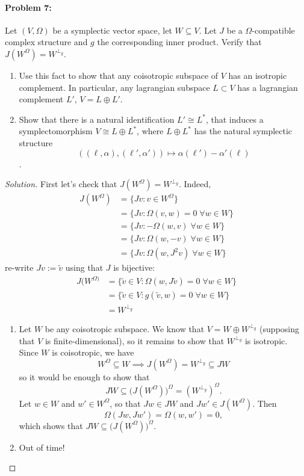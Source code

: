 \paragraph{Problem 7:} Let $(V,\Omega)$ be a symplectic vector space, let $W\subseteq V$. Let $J$ be a $\Omega$-compatible complex structure and $g$ the corresponding inner product. Verify that $J(W^{\Omega} )=W^{\perp_{g}}$.
\begin{enumerate}[label=\alph*.]
	\item Use this fact to show that any coisotropic subspace of $V$ has an isotropic complement. In particular, any lagrangian subspace $L\subset V$ has a lagrangian complement $L'$, $V=L\oplus L'$.
	
\item Show that there is a natural identification $L'\cong L^{*}$, that induces a symplectomorphism $V\cong L\oplus L^{*}$, where $L\oplus L^{*}$ has the natural symplectic structure \[\left( (\ell,\alpha),(\ell',\alpha') \right)\longmapsto\alpha(\ell')-\alpha'(\ell)\].
\end{enumerate}

\begin{proof}[Solution]\leavevmode
	First let's check that $J(W^{\Omega} )=W^{\perp_{g}}$. Indeed,
	\begin{align*}
		J(W^{\Omega} )&= \{Jv:v\in W^{\Omega}\}\\
&=\{Jv:\Omega(v,w)=0\;\forall w\in W\} \\
&=\{Jv:-\Omega(w,v)\;\forall w\in W\} \\
&=\{Jv:\Omega(w,-v)\;\forall w\in W\} \\
&=\{Jv:\Omega(w,J^{2}v)\;\forall w\in W\}
	\end{align*}
re-write $Jv:=\tilde{v}$ using that $J$ is bijective:
	\begin{align*}
J(W^{\Omega)}&=\{\tilde{v}\in V:\Omega(w,J\tilde{v})=0\;\forall w\in W\} \\
&=\{ \tilde{v}\in V:g(\tilde{v},w)=0\;\forall w\in W\} \\
& =W^{\perp_{g}}
	\end{align*}
	\begin{enumerate}[label=\alph*.]
		\item Let $W$ be any coisotropic subspace. We know that $V=W\oplus W^{\perp_g}$ (supposing that $V$ is finite-dimensional), so it remains to show that $W^{\perp_g}$ is isotropic.
		Since $W$ is coisotropic, we have
		\[W^{\Omega}\subseteq W\implies J(W^{\Omega})=W^{\perp_g}\subseteq JW\]
		so it would be enough to show that
		\[JW\subseteq\big(J(W^{\Omega})\big)^{\Omega}=(W^{\perp_g})^{\Omega}.\]
		Let $w\in W$ and $w'\in W^{\Omega}$, so that $Jw\in JW$ and $Jw'\in J(W^{\Omega})$. Then
		\[\Omega(Jw,Jw')=\Omega(w,w')=0,\]
		which shows that $JW\subseteq\big(J(W^{\Omega})\big)^{\Omega}$.

	\item Out of time!
	\end{enumerate}


\end{proof}

